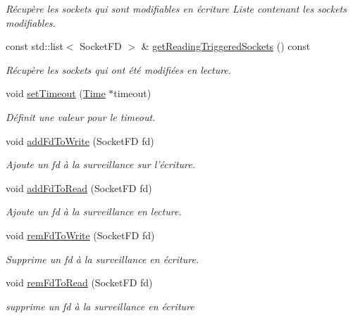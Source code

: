 \begin{DoxyCompactItemize}
\begin{DoxyCompactList}\small\item\em Récupère les sockets qui sont modifiables en écriture  Liste contenant les sockets modifiables. \end{DoxyCompactList}\item 
const std\-::list$<$ Socket\-F\-D $>$ \& \hyperlink{classmognetwork_1_1_selector_ae41a4ff4e9281cdd03880f69c0c71a35}{get\-Reading\-Triggered\-Sockets} () const 
\begin{DoxyCompactList}\small\item\em Récupère les sockets qui ont été modifiées en lecture. \end{DoxyCompactList}\item 
void \hyperlink{classmognetwork_1_1_selector_ac03b53749206d8ba80dec22bad55e0a8}{set\-Timeout} (\hyperlink{_selector_8hh_af47ac292ef7224cf549b944d138ba4ae}{Time} $\ast$timeout)
\begin{DoxyCompactList}\small\item\em Définit une valeur pour le timeout. \end{DoxyCompactList}\item 
void \hyperlink{classmognetwork_1_1_selector_a6f22d28dc38b5d252c0590de857d67f7}{add\-Fd\-To\-Write} (Socket\-F\-D fd)
\begin{DoxyCompactList}\small\item\em Ajoute un fd à la surveillance sur l'écriture. \end{DoxyCompactList}\item 
void \hyperlink{classmognetwork_1_1_selector_aacc48e5256e3b5150f80acad84b82de3}{add\-Fd\-To\-Read} (Socket\-F\-D fd)
\begin{DoxyCompactList}\small\item\em Ajoute un fd à la surveillance en lecture. \end{DoxyCompactList}\item 
void \hyperlink{classmognetwork_1_1_selector_ad03d2d3e016838b38fb865a7924915e5}{rem\-Fd\-To\-Write} (Socket\-F\-D fd)
\begin{DoxyCompactList}\small\item\em Supprime un fd à la surveillance en écriture. \end{DoxyCompactList}\item 
void \hyperlink{classmognetwork_1_1_selector_a1ae5d9e72ca6950f82d76e439ce9f74d}{rem\-Fd\-To\-Read} (Socket\-F\-D fd)
\begin{DoxyCompactList}\small\item\em supprime un fd à la surveillance en écriture \end{DoxyCompactList}\end{DoxyCompactItemize}


